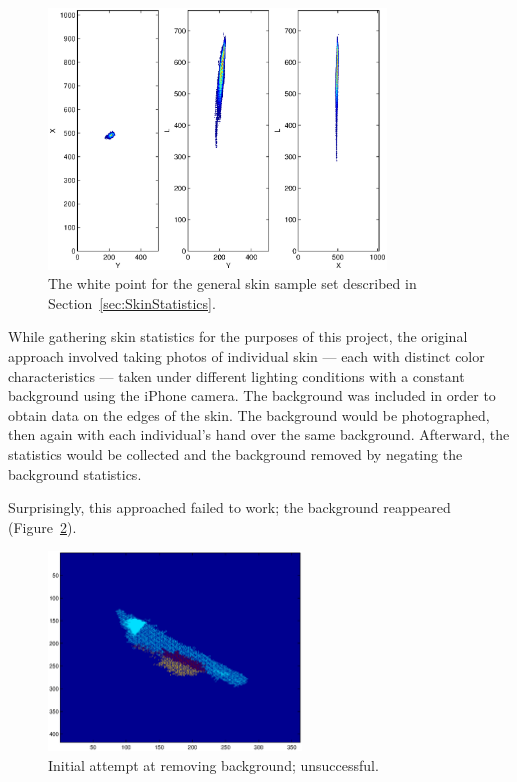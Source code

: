 \begin{figure}[h!]
  \centering
    \includegraphics[width=0.80\textwidth]{Chapter3/Figs/lxy_general_white_point.eps}
    \caption{The white point for the general skin sample set described in Section~\ref{sec:SkinStatistics}.}  \label{fig:WhitePoint}
\end{figure}

While gathering skin statistics for the purposes of this project, the original approach involved taking photos of individual skin --- each with distinct color characteristics --- taken under different lighting conditions with a constant background using the iPhone camera. The background was included in order to obtain data on the edges of the skin. The background would be photographed, then again with each individual's hand over the same background. Afterward, the statistics would be collected and the background removed by negating the background statistics.

Surprisingly, this approached failed to work; the background reappeared (Figure~\ref{fig:BGFailure}).

\begin{figure}[h!]
  \centering
    \includegraphics[width=0.60\textwidth]{Chapter3/Figs/xy_bg_failed.eps}
    \caption{Initial attempt at removing background; unsuccessful.} \label{fig:BGFailure}
\end{figure}


